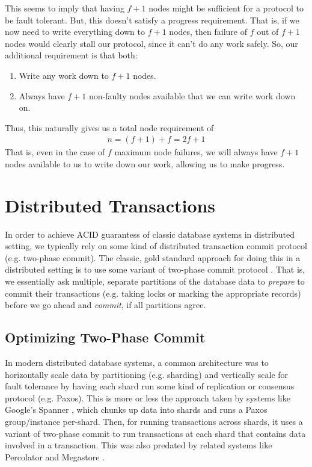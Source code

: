 \documentclass[10pt,a4paper]{article}
\begin{document}
This seems to imply that having $f+1$ nodes might be sufficient for a protocol to be fault tolerant. But, this doesn't satisfy a progress requirement. That is, if we now need to write everything down to $f+1$ nodes, then failure of $f$ out of $f+1$ nodes would clearly stall our protocol, since it can't do any work safely. So, our additional requirement is that both: 
\begin{enumerate}[1)]
    \item Write any work down to $f+1$ nodes.
    \item Always have $f+1$ non-faulty nodes available that we can write work down on.
\end{enumerate}
Thus, this naturally gives us a total node requirement of 
\begin{align*}
    n = (f+1) + f = 2f + 1
\end{align*}
That is, even in the case of $f$ maximum node failures, we will always have $f+1$ nodes available to us to write down our work, allowing us to make progress.

\section{Distributed Transactions}

In order to achieve ACID guarantess of classic database systems in distributed setting, we typically rely on some kind of distributed transaction commit protocol (e.g. two-phase commit). The classic, gold standard approach for doing this in a distributed setting is to use some variant of two-phase commit protocol \cite{1986concurrency}. That is, we essentially ask multiple, separate partitions of the database data to \textit{prepare} to commit their transactions (e.g. taking locks or marking the appropriate records) before we go ahead and \textit{commit}, if all partitions agree.

\subsection{Optimizing Two-Phase Commit}

In modern distributed database systems, a common architecture  was to horizontally scale data by partitioning (e.g. sharding) and vertically scale for fault tolerance by having each shard run some kind of replication or consensus protocol (e.g. Paxos). This is more or less the approach taken by systems like Google's Spanner \cite{2012spanner}, which chunks up data into shards and runs a Paxos group/instance per-shard. Then, for running transactions across shards, it uses a variant of two-phase commit to run transactions at each shard that contains data involved in a transaction. This was also predated by related systems like Percolator \cite{2010percolator} and Megastore \cite{2011megastore}. 
\end{document}
